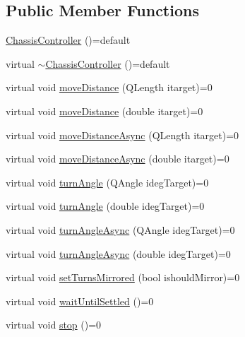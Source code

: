 \subsection*{Public Member Functions}
\begin{DoxyCompactItemize}
\item 
\mbox{\hyperlink{classokapi_1_1ChassisController_a8a4a431cb9da03a1c84e600dc0e31333}{Chassis\+Controller}} ()=default
\item 
virtual \mbox{\hyperlink{classokapi_1_1ChassisController_a886a1cfbd9430fb2fbe177bc4d4ab392}{$\sim$\+Chassis\+Controller}} ()=default
\item 
virtual void \mbox{\hyperlink{classokapi_1_1ChassisController_a6d5b69139dfa8b814d05c74c22bcaa43}{move\+Distance}} (Q\+Length itarget)=0
\item 
virtual void \mbox{\hyperlink{classokapi_1_1ChassisController_a58619e777fd1b3f8e1aae871d46a8ccf}{move\+Distance}} (double itarget)=0
\item 
virtual void \mbox{\hyperlink{classokapi_1_1ChassisController_a67a17268b871a4f1ae74d67891cbf5dd}{move\+Distance\+Async}} (Q\+Length itarget)=0
\item 
virtual void \mbox{\hyperlink{classokapi_1_1ChassisController_a24b46ec1c42f32c0527d57738a07820a}{move\+Distance\+Async}} (double itarget)=0
\item 
virtual void \mbox{\hyperlink{classokapi_1_1ChassisController_aab12308b3fad6793c007d7a33730a3f7}{turn\+Angle}} (Q\+Angle ideg\+Target)=0
\item 
virtual void \mbox{\hyperlink{classokapi_1_1ChassisController_a6aca227e35ececd02eed1cc42d09ad1d}{turn\+Angle}} (double ideg\+Target)=0
\item 
virtual void \mbox{\hyperlink{classokapi_1_1ChassisController_a87fc1f88bf06340d8f022a8c185b5e87}{turn\+Angle\+Async}} (Q\+Angle ideg\+Target)=0
\item 
virtual void \mbox{\hyperlink{classokapi_1_1ChassisController_a35cadd99478629637b4bd3a5e709871a}{turn\+Angle\+Async}} (double ideg\+Target)=0
\item 
virtual void \mbox{\hyperlink{classokapi_1_1ChassisController_a37ae36ec8936272eb31e3baed7eed417}{set\+Turns\+Mirrored}} (bool ishould\+Mirror)=0
\item 
virtual void \mbox{\hyperlink{classokapi_1_1ChassisController_a01ed4e0eb7332cc149228387bbf1e91c}{wait\+Until\+Settled}} ()=0
\item 
virtual void \mbox{\hyperlink{classokapi_1_1ChassisController_ac67edbbbe1c8480c4503b9875a3719cd}{stop}} ()=0

\end{DoxyCompactItemize}
